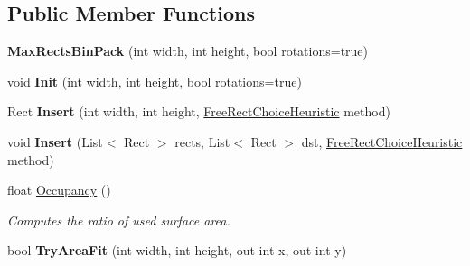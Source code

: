 \subsection*{Public Member Functions}
\begin{DoxyCompactItemize}
\item 
\mbox{\label{class_super_tiled2_unity_1_1_editor_1_1_third_party_1_1_max_rects_bin_pack_ab92bf328850421243b691436caa6ed71}} 
{\bfseries Max\+Rects\+Bin\+Pack} (int width, int height, bool rotations=true)
\item 
\mbox{\label{class_super_tiled2_unity_1_1_editor_1_1_third_party_1_1_max_rects_bin_pack_ade04b068b83ead937adad11e03c75698}} 
void {\bfseries Init} (int width, int height, bool rotations=true)
\item 
\mbox{\label{class_super_tiled2_unity_1_1_editor_1_1_third_party_1_1_max_rects_bin_pack_aa50d29d118a01c8db5cc46ac6f9a10ad}} 
Rect {\bfseries Insert} (int width, int height, \mbox{\hyperlink{class_super_tiled2_unity_1_1_editor_1_1_third_party_1_1_max_rects_bin_pack_a078e71237c51537c9c3445b68f9e980a}{Free\+Rect\+Choice\+Heuristic}} method)
\item 
\mbox{\label{class_super_tiled2_unity_1_1_editor_1_1_third_party_1_1_max_rects_bin_pack_a0cd04a4a738748c7afef531e7030ae54}} 
void {\bfseries Insert} (List$<$ Rect $>$ rects, List$<$ Rect $>$ dst, \mbox{\hyperlink{class_super_tiled2_unity_1_1_editor_1_1_third_party_1_1_max_rects_bin_pack_a078e71237c51537c9c3445b68f9e980a}{Free\+Rect\+Choice\+Heuristic}} method)
\item 
\mbox{\label{class_super_tiled2_unity_1_1_editor_1_1_third_party_1_1_max_rects_bin_pack_aadb3536440c1be314e47ab79312967b5}} 
float \mbox{\hyperlink{class_super_tiled2_unity_1_1_editor_1_1_third_party_1_1_max_rects_bin_pack_aadb3536440c1be314e47ab79312967b5}{Occupancy}} ()
\begin{DoxyCompactList}\small\item\em Computes the ratio of used surface area. \end{DoxyCompactList}\item 
\mbox{\label{class_super_tiled2_unity_1_1_editor_1_1_third_party_1_1_max_rects_bin_pack_ae4b71e40ffd18bf2d3b8fc352a76b80e}} 
bool {\bfseries Try\+Area\+Fit} (int width, int height, out int x, out int y)
\end{DoxyCompactItemize}
